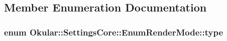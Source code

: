 \subsection{Member Enumeration Documentation}
\hypertarget{classOkular_1_1SettingsCore_1_1EnumRenderMode_aae172bdb345dda4d639e763709ea357a}{
\subsubsection[{type}]{\setlength{\rightskip}{0pt plus 5cm}enum {\bf Okular\+::\+Settings\+Core\+::\+Enum\+Render\+Mode\+::type}}}\label{classOkular_1_1SettingsCore_1_1EnumRenderMode_aae172bdb345dda4d639e763709ea357a}

